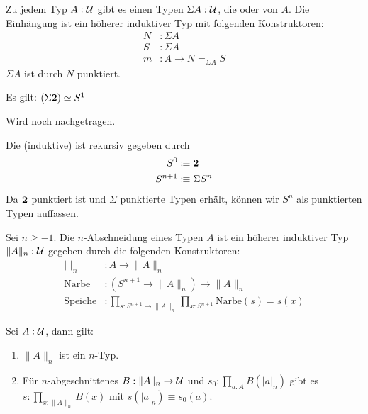 \begin{regeln}[Einhängung]
  Zu jedem Typ $A:\mathcal{U}$ gibt es einen Typen $\Sigma A:\mathcal{U}$, die  oder  von $A$.
  Die Einhängung ist ein höherer induktiver Typ mit folgenden Konstruktoren:
  \begin{align*}
    N&:\Sigma A \\
    S&:\Sigma A \\
    m&:A\to N=_{\Sigma A}S
  \end{align*}
  $\Sigma A$ ist durch $N$ punktiert.
\end{regeln}

\begin{bemerkung}
  Es gilt: $(\Sigma\mathbf{2})\simeq S^1$
\end{bemerkung}
\begin{beweis}
  Wird noch nachgetragen.
\end{beweis}

\begin{definition}
  Die (induktive)  ist rekursiv gegeben durch
  \begin{align*}
    S^0&\vcentcolon\mspace{-1.2mu}\equiv \mathbf{2} \\
    S^{n+1}&\vcentcolon\mspace{-1.2mu}\equiv \Sigma S^n
  \end{align*}
  Da $\mathbf{2}$ punktiert ist und $\Sigma$ punktierte Typen erhält, können wir $S^n$ als punktierten Typen auffassen.
\end{definition}

\begin{regeln}
  Sei $n\geq -1$.
  Die $n$-Abschneidung eines Typen $A$ ist ein höherer induktiver Typ $\|A\|_n:\mathcal{U}$ gegeben durch die folgenden Konstruktoren:
  \begin{align*}
    |\_|_n&:A\to \|A\|_n \\
    \mathrm{Narbe}&:(S^{n+1}\to \|A\|_n)\to \|A\|_n \\
    \mathrm{Speiche}&:\prod_ {s:S^{n+1}\to \|A\|_n}\prod_{x:S^{n+1}} \mathrm{Narbe}(s)=s(x)
  \end{align*}
\end{regeln}

\begin{theorem}
  \label{thm:n-truncation}
  Sei $A:\mathcal{U}$, dann gilt:
  \begin{enumerate}
  \item $\|A\|_n$ ist ein $n$-Typ.
  \item Für $n$-abgeschnittenes $B:\|A\|_n\to\mathcal{U}$ und $s_0:\prod_{a:A}B(|a|_n)$ gibt es $s:\prod_{x:\|A\|_n}B(x)$ mit $s(|a|_n)\equiv s_0(a)$.
  \end{enumerate}
\end{theorem}

